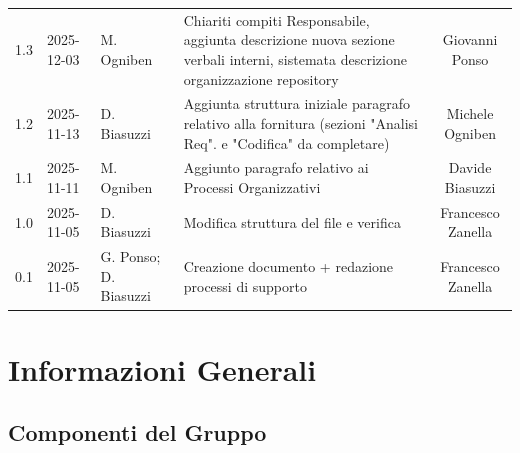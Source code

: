 \documentclass[a4paper, 11pt, oneside]{scrartcl}
\begin{document}
\begin{center}
{\begin{tabular}{@{}llp{}p{}c@{}}
            1.3               & 2025-12-03    & M. Ogniben            & Chiariti compiti Responsabile, aggiunta descrizione nuova sezione verbali interni, sistemata descrizione organizzazione repository                                                                              & Giovanni Ponso        \\
            1.2               & 2025-11-13    & D. Biasuzzi           & Aggiunta struttura iniziale paragrafo relativo alla fornitura (sezioni "Analisi Req". e "Codifica" da completare)                                                                                               & Michele Ogniben       \\
            1.1               & 2025-11-11    & M. Ogniben            & Aggiunto paragrafo relativo ai Processi Organizzativi                                                                                                                                                           & Davide Biasuzzi       \\
            1.0               & 2025-11-05    & D. Biasuzzi           & Modifica struttura del file e verifica                                                                                                                                                                          & Francesco Zanella     \\
            0.1               & 2025-11-05    & G. Ponso; D. Biasuzzi & Creazione documento + redazione processi di supporto                                                                                                                                                            & Francesco Zanella     \\
            \bottomrule
        \end{tabular}
    }
\end{center}

\newpage
\tableofcontents
\pagestyle{fancy}

\newpage
\section{Informazioni Generali}

\subsection{Componenti del Gruppo}
\end{document}

